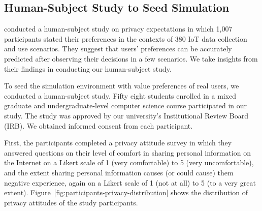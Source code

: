 \subsection{Human-Subject Study to Seed Simulation}
\label{sec:survey}

\citet{Naeini-SOUPS2017-PrivacyExpectations+IOT} conducted a human-subject study on privacy expectations in which 1,007 participants stated their preferences in the contexts of 380 IoT data collection and use scenarios. They suggest that users' preferences can be accurately predicted after observing their decisions in a few scenarios. We take insights from their findings in conducting our human-subject study. 

To seed the simulation environment with value preferences of real users, we conducted a human-subject study. Fifty eight students enrolled in a mixed graduate and undergraduate-level computer science course participated in our study. The study was approved by our university's Institutional Review Board (IRB). We obtained informed consent from each participant. 

First, the participants completed a privacy attitude survey \citep{schnorf2014comparison}  in which they answered questions on their level of comfort in sharing personal information on the Internet on a Likert scale of 1 (very comfortable) to 5 (very uncomfortable), and the extent sharing personal information causes (or could cause) them negative experience, again on a Likert scale of 1 (not at all) to 5 (to a very great extent). Figure~\ref{fig:participants-privacy-distribution} shows the distribution of privacy attitudes of the study participants. 

    
